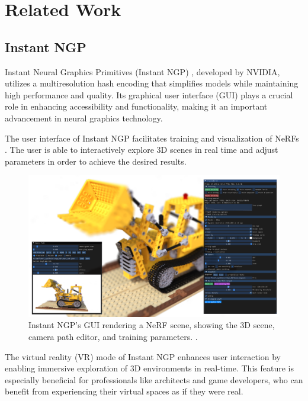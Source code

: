 %
\chapter{Related Work}
\label{sec:related}

\section{Instant NGP}

Instant Neural Graphics Primitives (Instant NGP) \cite{muller_instant_2022}, developed by NVIDIA, utilizes a multiresolution hash encoding that simplifies models while maintaining high performance and quality.
Its graphical user interface (GUI) plays a crucial role in enhancing accessibility and functionality, making it an important advancement in neural graphics technology.

The user interface of Instant NGP facilitates training and visualization of NeRFs .
The user is able to interactively explore 3D scenes in real time and adjust parameters in order to achieve the desired results.

\begin{figure}[h!]
  \centering
  \includegraphics[width=\textwidth]{figures/realted-instant-ngp.png}
  \caption{Instant NGP's GUI rendering a NeRF scene, showing the 3D scene, camera path editor, and training parameters.
   \cite{muller_instant_2022}.}
  \label{fig:instant-ngp}
\end{figure}

The virtual reality (VR) mode of Instant NGP enhances user interaction by enabling immersive exploration of 3D environments in real-time.
This feature is especially beneficial for professionals like architects and game developers, who can benefit from experiencing their virtual spaces as if they were real.

